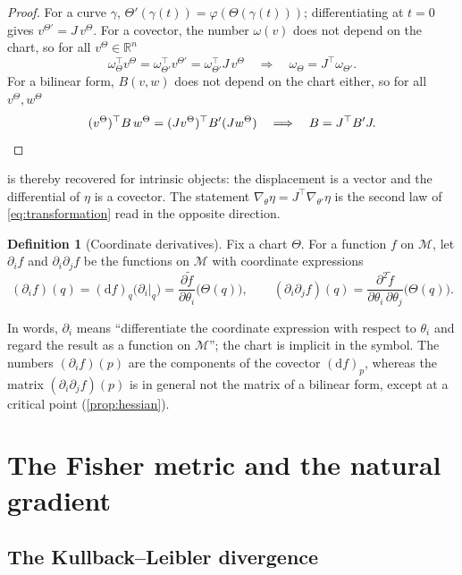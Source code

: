 \documentclass[11pt,a4paper]{article}
\numberwithin{equation}{section}
\theoremstyle{plain}
\theoremstyle{definition}
\newtheorem{definition}[theorem]{Definition}
\theoremstyle{remark}
\newcommand{\R}{\mathbb{R}}
\newcommand{\T}{^{\top}}
\newcommand{\dd}{\mathrm{d}}
\newcommand{\mani}{\mathcal{M}}
\begin{document}
\begin{proof}
For a curve $\gamma$, $\Theta'(\gamma(t))=\varphi(\Theta(\gamma(t)))$; differentiating at $t=0$ gives $v^{\Theta'}=J\,v^\Theta$.
For a covector, the number $\omega(v)$ does not depend on the chart, so for all $v^\Theta\in\R^n$
\[
  \omega_\Theta\T v^\Theta=\omega_{\Theta'}\T v^{\Theta'}=\omega_{\Theta'}\T J\,v^\Theta
  \quad\Longrightarrow\quad
  \omega_\Theta=J\T\omega_{\Theta'} .
\]
For a bilinear form, $B(v,w)$ does not depend on the chart either, so for all $v^\Theta,w^\Theta$
\[
  (v^\Theta)\T B\,w^\Theta=(Jv^\Theta)\T B'(Jw^\Theta)
  \quad\Longrightarrow\quad
  B=J\T B'J . \qedhere
\]
\end{proof}

 is thereby recovered for intrinsic objects: the displacement is a vector and the differential of $\eta$ is a covector.
The statement $\nabla_\theta\eta=J\T\nabla_{\theta'}\eta$ is the second law of \eqref{eq:transformation} read in the opposite direction.

\begin{definition}[Coordinate derivatives]\label{def:coordder}
Fix a chart $\Theta$. For a function $f$ on $\mani$, let $\partial_if$ and $\partial_i\partial_jf$ be the functions on $\mani$ with
coordinate expressions
\begin{equation}\label{eq:coordder}
  (\partial_if)(q)=(\dd f)_q\bigl(\partial_i|_q\bigr)=\frac{\partial\tilde f}{\partial\theta_i}\bigl(\Theta(q)\bigr),
  \qquad
  (\partial_i\partial_jf)(q)=\frac{\partial^2\tilde f}{\partial\theta_i\,\partial\theta_j}\bigl(\Theta(q)\bigr).
\end{equation}
\end{definition}

In words, $\partial_i$ means ``differentiate the coordinate expression with respect to $\theta_i$ and regard the result as a function on
$\mani$''; the chart is implicit in the symbol. The numbers $(\partial_if)(p)$ are the components of the covector $(\dd f)_p$, whereas the matrix
$(\partial_i\partial_jf)(p)$ is in general not the matrix of a bilinear form, except at a critical point (\cref{prop:hessian}).

\section{The Fisher metric and the natural gradient}\label{sec:metric}

\subsection{The Kullback--Leibler divergence}
\end{document}
